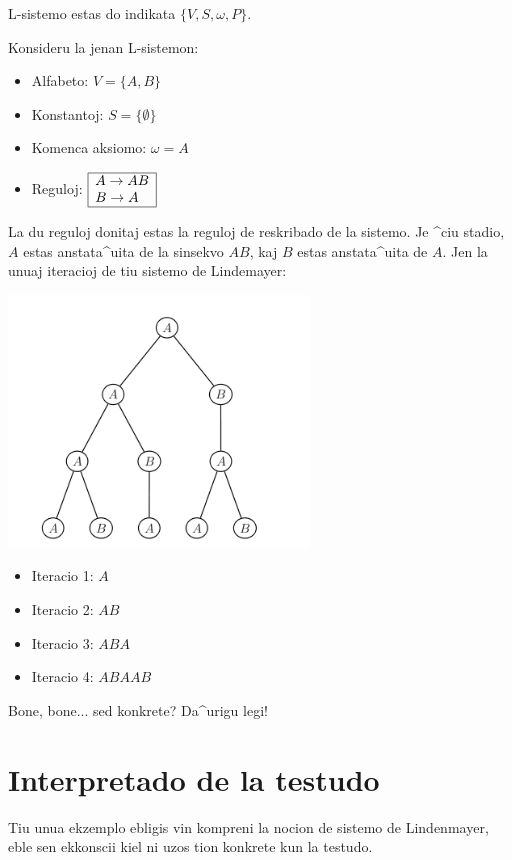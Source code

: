 L-sistemo estas do indikata $\{V,S,\omega,P\}$.

Konsideru la jenan L-sistemon:
\begin{itemize}
\item Alfabeto: $V = \{A, B\}$
\item Konstantoj: $S = \{\emptyset\}$
\item Komenca aksiomo: $\omega = A$
\item Reguloj: 
  $\begin{array}{|l|}
    \hline
    A \rightarrow AB \\
    B \rightarrow A \\ 
    \hline
  \end{array}$
\end{itemize}
La du reguloj donitaj estas la reguloj de reskribado de la sistemo.
Je ^ciu stadio, $A$ estas anstata^uita de la sinsekvo $AB$, kaj $B$
estas anstata^uita de $A$.  Jen la unuaj iteracioj de tiu sistemo de
Lindemayer:
\begin{center}
  \includegraphics[width=8cm]{bildoj/linden-arbre.png}
\end{center}
\begin{itemize}
\item Iteracio 1: $A$
\item Iteracio 2: $AB$
\item Iteracio 3: $ABA$
\item Iteracio 4: $ABAAB$
\end{itemize}
\vspace*{0.2cm}
Bone, bone... sed konkrete? Da^urigu legi!

\section{Interpretado de la testudo}

Tiu unua ekzemplo ebligis vin kompreni la nocion de sistemo de
Lindenmayer, eble sen ekkonscii kiel ni uzos tion konkrete kun la
testudo.

